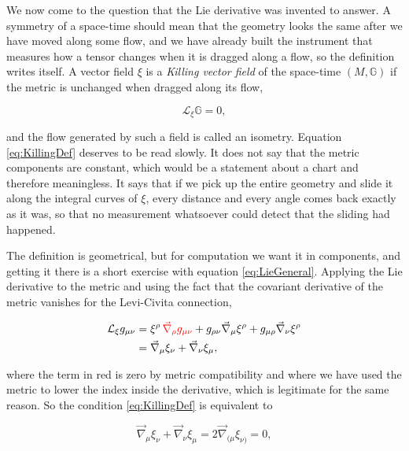         We now come to the question that the Lie derivative was invented to answer. A symmetry of a space-time should mean that the geometry looks the same after we have moved along some flow, and we have already built the instrument that measures how a tensor changes when it is dragged along a flow, so the definition writes itself. A vector field $\xi$ is a \textit{Killing vector field} of the space-time $(M,\mathbb{G})$ if the metric is unchanged when dragged along its flow,

        \begin{equation}\label{eq:KillingDef}
            \mathcal{L}_{\xi}\mathbb{G} = 0,
        \end{equation}

        and the flow generated by such a field is called an isometry. Equation \ref{eq:KillingDef} deserves to be read slowly. It does not say that the metric components are constant, which would be a statement about a chart and therefore meaningless. It says that if we pick up the entire geometry and slide it along the integral curves of $\xi$, every distance and every angle comes back exactly as it was, so that no measurement whatsoever could detect that the sliding had happened.

        The definition is geometrical, but for computation we want it in components, and getting it there is a short exercise with equation \ref{eq:LieGeneral}. Applying the Lie derivative to the metric and using the fact that the covariant derivative of the metric vanishes for the Levi-Civita connection,

        \begin{align*}
            \mathcal{L}_{\xi}g_{\mu\nu} &= \xi^{\rho}\,{\color{red}\Vec{\nabla}_{\rho}g_{\mu\nu}} + g_{\rho\nu}\Vec{\nabla}_{\mu}\xi^{\rho} + g_{\mu\rho}\Vec{\nabla}_{\nu}\xi^{\rho}\\
            &= \Vec{\nabla}_{\mu}\xi_{\nu} + \Vec{\nabla}_{\nu}\xi_{\mu},
        \end{align*}

        where the term in red is zero by metric compatibility and where we have used the metric to lower the index inside the derivative, which is legitimate for the same reason. So the condition \ref{eq:KillingDef} is equivalent to

        \begin{equation}\label{eq:KillingEquation}
            \Vec{\nabla}_{\mu}\xi_{\nu} + \Vec{\nabla}_{\nu}\xi_{\mu} = 2\Vec{\nabla}_{(\mu}\xi_{\nu)} = 0,
        \end{equation}

